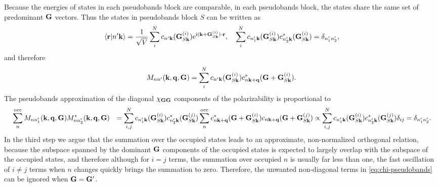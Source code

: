\documentclass[hyperref, a4paper]{article}
\newcommand*{\ii}{\mathrm{i}}
\newcommand*{\ee}{\mathrm{e}}
\def\\{}%
\begin{document}
Because the energies of states in each pseudobands block are comparable, 
in each pseudobands block, the states share the same set of predominant $\vb{G}$ vectors.
Thus the states in pseudobands block $S$ can be written as 
\begin{equation}
    \braket*{\vb{r}}{n' \vb{k}} = \frac{1}{\sqrt{V}} \sum_i^N 
    c_{n' \vb{k}}(\vb{G}^{(i)}_{S \vb{k}}) \ee^{\ii (\vb{k} + \vb{G}^{(i)}_{S \vb{k}}) \cdot \vb{r}}, \quad 
    \sum_{i}^{N} c_{n'_1 \vb{k}}(\vb{G}^{(i)}_{S \vb{k}}) c_{n'_2 \vb{k}}^* (\vb{G}^{(i)}_{S \vb{k}}) = \delta_{n'_1 n'_2},
\end{equation}
and therefore 
\begin{equation}
    M_{nn'}(\vb{k}, \vb{q}, \vb{G}) = \sum_{i}^{N} c_{n' \vb{k}}(\vb{G}^{(i)}_{S \vb{k}})  c_{n \vb{k} + \vb{q}}^*(\vb{G} + \vb{G}_{S \vb{k}}^{(i)}).
\end{equation}
The pseudobands approximation of the diagonal $\chi_{\vb{G} \vb{G}}$ components of the polarizability 
is proportional to 
\begin{equation}
    \begin{aligned}
    &\quad \sum_n^{\text{occ}} M_{n n'_1} (\vb{k}, \vb{q}, \vb{G}) M^*_{n n'_2} (\vb{k}, \vb{q}, \vb{G}) \\
    &= \sum_{i , j}^N 
    c_{n'_1 \vb{k}}(\vb{G}_{S \vb{k}}^{(i)}) 
    c^{*}_{n'_2 \vb{k}}(\vb{G}_{S \vb{k}}^{(j)})
    \sum_{n}^{\text{occ}} 
    c_{n \vb{k} + \vb{q}}^*(\vb{G} + \vb{G}^{(i)}_{S \vb{k}})
    c_{n \vb{k} + \vb{q}}  (\vb{G} + \vb{G}^{(j)}_{S \vb{k}}) \\
    &\propto \sum_{i , j}^N  
    c_{n'_1 \vb{k}}(\vb{G}^{(i)}_{S \vb{k}}) 
    c^{*}_{n'_2 \vb{k}}(\vb{G}^{(j)}_{S \vb{k}}) \delta_{ij} = \delta_{n_1' n_2'}.
    \end{aligned}
\end{equation}
In the third step we argue that the summation over the occupied states leads to 
an approximate, non-normalized orthogonal relation,
because the subspace spanned by the dominant $\vb{G}$ components of the occupied states 
is expected to largely overlap with the subspace of the occupied states,
and therefore although for $i=j$ terms, the summation over occupied $n$ is usually far less than one, 
the fast oscillation of $i \neq j$ terms when $n$ changes quickly brings the summation to zero.
Therefore, the unwanted non-diagonal terms in \eqref{eq:chi-pseudobands} 
can be ignored when $\vb{G} = \vb{G}'$.
\end{document}
